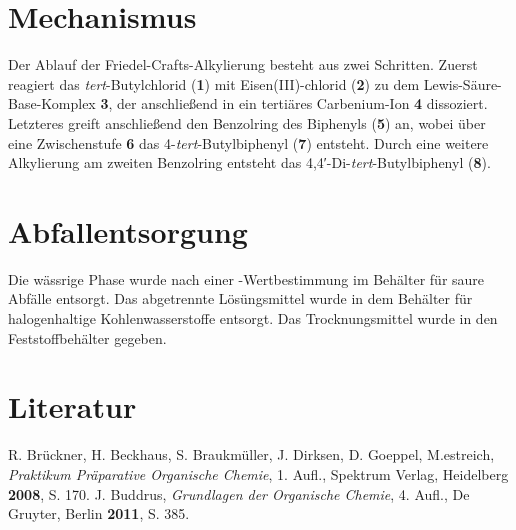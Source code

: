 \documentclass[12pt]{article}
\begin{document}
\begin{onehalfspace}
\section{Mechanismus\cite{bio}}
Der Ablauf der Friedel-Crafts-Alkylierung besteht aus zwei Schritten. Zuerst reagiert das \textit{tert}-Butylchlorid (\textbf{1}) mit Eisen(III)-chlorid (\textbf{2}) zu dem Lewis-Säure-Base-Komplex \textbf{3}, der anschließend in ein tertiäres Carbenium-Ion \textbf{4} dissoziert. Letzteres greift anschließend den Benzolring des Biphenyls (\textbf{5}) an, wobei über eine Zwischenstufe \textbf{6} das 4-\textit{tert}-Butylbiphenyl (\textbf{7}) entsteht. Durch eine weitere Alkylierung am zweiten Benzolring entsteht das 4,4′-Di-\textit{tert}-Butylbiphenyl (\textbf{8}).
\section{Abfallentsorgung}
Die wässrige Phase wurde nach einer \pH-Wertbestimmung im Behälter für saure Abfälle entsorgt. Das abgetrennte Lösüngsmittel wurde in dem Behälter für halogenhaltige Kohlenwasserstoffe entsorgt. Das Trocknungsmittel wurde in den Feststoffbehälter gegeben.
\section{Literatur}
\renewcommand{\section}[2]{}%
\begin{thebibliography}{}
R. Brückner, H. Beckhaus, S. Braukmüller, J. Dirksen, D. Goeppel, M.estreich, \textit{Praktikum Präparative Organische Chemie}, 1. Aufl., Spektrum Verlag, Heidelberg \textbf{2008}, S. 170. 
J. Buddrus, \textit{Grundlagen der Organische Chemie}, 4. Aufl., De Gruyter, Berlin \textbf{2011}, S. 385.
\end{thebibliography}
\end{onehalfspace}
\end{document}
